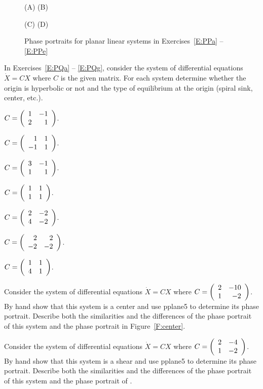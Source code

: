 \documentclass{ximera}
\begin{document}
\begin{figure}[htb]
\centerline{(A) \hspace{2.7in} (B)}
           \centerline{%
           }
\centerline{(C) \hspace{2.7in} (D)}
           \centerline{%
           }
\caption{Phase portraits for planar linear systems in
Exercises~\protect\ref{E:PPa} -- \protect\ref{E:PPe}}
\label{F:PP}
\end{figure}

\noindent In Exercises~\ref{E:PQa} -- \ref{E:PQg}, consider the system of
differential equations $\dot{X}=CX$ where $C$ is the given matrix.  For each
system determine whether the origin is hyperbolic or not and the type of
equilibrium at the origin (spiral sink, center, etc.).
\begin{exercise}  \label{E:PQa}
$C = \left(\begin{array}{rr} 1 & -1\\ 2 &1\end{array}\right)$.
\end{exercise}
\begin{exercise}  \label{E:PQb}
$C = \left(\begin{array}{rr} 1 & 1\\ -1 &1\end{array}\right)$.
\end{exercise}
\begin{exercise}  \label{E:PQc}
$C = \left(\begin{array}{rr} 3 & -1\\ 1 &1\end{array}\right)$.
\end{exercise}
\begin{exercise}  \label{E:PQd}
$C = \left(\begin{array}{rr} 1 & 1\\ 1 &1\end{array}\right)$.
\end{exercise}
\begin{exercise}  \label{E:PQe}
$C = \left(\begin{array}{rr} 2 & -2\\ 4 &-2\end{array}\right)$.
\end{exercise}
\begin{exercise}  \label{E:PQf}
$C = \left(\begin{array}{rr} 2 & 2\\ -2 &-2\end{array}\right)$.
\end{exercise}
\begin{exercise}  \label{E:PQg}
$C = \left(\begin{array}{rr} 1 & 1\\ 4 &1\end{array}\right)$.
\end{exercise}

\CEXER

\begin{exercise}  \label{E:notcircles}
Consider the system of differential equations $\dot{X}=CX$ where
$C=\left(\begin{array}{rr} 2 & -10\\ 1 &-2\end{array}\right)$.  By hand show that this system is a center and
use {\sf pplane5} to determine its phase portrait.  Describe both the
similarities and the differences of the phase portrait of this system
and the phase portrait in Figure~\ref{F:center}.
\end{exercise}

\begin{exercise} \label{c6.9.5}
Consider the system of differential equations $\dot{X}=CX$ where
$C=\left(\begin{array}{rr} 2 & -4\\ 1 &-2\end{array}\right)$.  By hand show that this system is a shear and
use {\sf pplane5} to determine its phase portrait.  Describe both the
similarities and the differences of the phase portrait of this system
and the phase portrait of .
\end{exercise}
\end{document}
